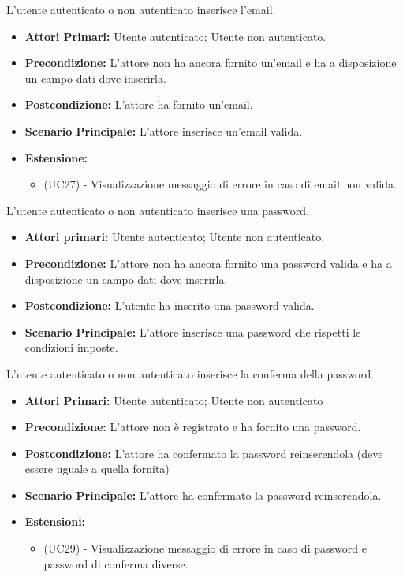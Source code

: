 L'utente autenticato o non autenticato inserisce l'email.
\begin{itemize}
    \item \textbf{Attori Primari:} Utente autenticato; Utente non autenticato.
    \item \textbf{Precondizione:} L'attore non ha ancora fornito un'email e ha a disposizione un campo dati dove inserirla.
    \item \textbf{Postcondizione:} L'attore ha fornito un'email.
    \item \textbf{Scenario Principale:} L'attore inserisce un'email valida.
    \item \textbf{Estensione:}
    \begin{itemize}
        \item (UC27) - Visualizzazione messaggio di errore in caso di email non valida.
    \end{itemize}
\end{itemize}

L'utente autenticato o non autenticato inserisce una password.
\begin{itemize}
    \item \textbf{Attori primari:} Utente autenticato; Utente non autenticato.
    \item \textbf{Precondizione:} L'attore non ha ancora fornito una password valida e ha a disposizione un campo dati dove inserirla.
    \item \textbf{Postcondizione:} L'utente ha inserito una password valida.
    \item \textbf{Scenario Principale:} L'attore inserisce una password che rispetti le condizioni imposte.
\end{itemize}

L'utente autenticato o non autenticato inserisce la conferma della password.
\begin{itemize}
    \item \textbf{Attori Primari:} Utente autenticato; Utente non autenticato
    \item \textbf{Precondizione:} L'attore non è registrato e ha fornito una password.
    \item \textbf{Postcondizione:} L'attore ha confermato la password reinserendola (deve essere uguale a quella fornita)
    \item \textbf{Scenario Principale:} L'attore ha confermato la password reinserendola.
    \item \textbf{Estensioni:}
    \begin{itemize}
        \item (UC29) - Visualizzazione messaggio di errore in caso di password e password di conferma diverse.
    \end{itemize}
\end{itemize}

